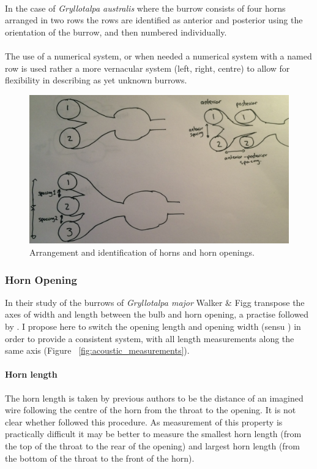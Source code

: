 \documentclass{article}
\begin{document}
   \paragraph{}
   In the case of \textit{Gryllotalpa australis} where the burrow consists of four horns arranged in two rows the rows are identified as anterior and posterior using the orientation of the burrow, and then numbered individually.
   \paragraph{}
   The use of a numerical system, or when needed a numerical system with a named row is used rather a more vernacular system (left, right, centre) to allow for flexibility in describing as yet unknown burrows.
   
   \begin{figure}[h]
   	\includegraphics[width=\textwidth]{acoustic_horn_number}
   	\caption{Arrangement and identification of horns and horn openings.}
   	\label{fig:acoustic_horn_number}
   \end{figure}
   
   \subsubsection{Horn Opening}
   In their study of the burrows of \textit{Gryllotalpa major} Walker \& Figg \cite{walker1990} transpose the axes of width and length between the bulb and horn opening, a practise followed by \cite{jafari2015}. I propose here to switch the opening length and opening width (sensu \cite{walker1990}) in order to provide a consistent system, with all length measurements along the same axis (Figure ~\ref{fig:acoustic_measurements}).
   \paragraph{Horn length}
   The horn length is taken  by previous authors to be the distance of an imagined wire following the centre of the horn from the throat to the opening. It is not clear whether \cite{jafari2015} followed this procedure. As measurement of this property is practically difficult it may be better to measure the smallest horn length (from the top of the throat to the rear of the opening) and largest horn length (from the bottom of the throat to the front of the horn).
\end{document}
